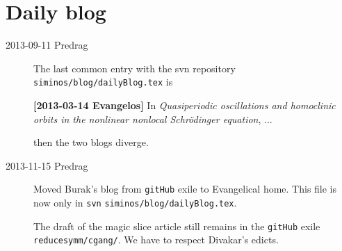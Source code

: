 
\chapter{Daily blog}
\label{c-DailyBlog}


\begin{description}
\item[2013-09-11  Predrag] The last common entry with the svn repository
\\    \texttt{siminos/blog/dailyBlog.tex} is

{\bf [2013-03-14 Evangelos]} In
\emph{Quasiperiodic oscillations and homoclinic orbits in the nonlinear nonlocal
Schr\"odinger equation}, ...

then the two blogs diverge.

\item[2013-11-15  Predrag] Moved Burak's blog from \texttt{gitHub} exile
to Evangelical home. This file is now only in \texttt{svn}
 \texttt{siminos/blog/dailyBlog.tex}.

The draft of the magic slice article still remains in the
 \texttt{gitHub} exile \texttt{reducesymm/cgang/}. We have to respect Divakar's edicts.

\end{description}

